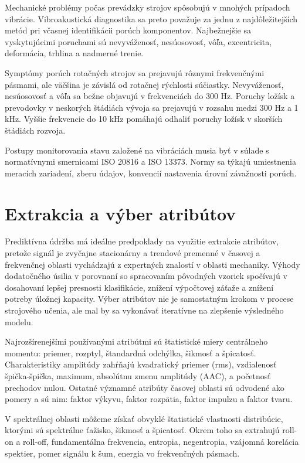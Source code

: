 Mechanické problémy počas prevádzky strojov spôsobujú v mnohých prípadoch vibrácie. Vibroakustická diagnostika sa preto považuje za jednu z najdôležitejších metód pri včasnej identifikácii porúch komponentov. Najbežnejšie sa vyskytujúcimi poruchami sú nevyváženosť, nesúosovosť, vôľa, excentricita, deformácia, trhlina a nadmerné trenie. 

Symptómy porúch rotačných strojov sa prejavujú rôznymi frekvenčnými pásmami, ale väčšina je závislá od rotačnej rýchlosti súčiastky. Nevyváženosť, nesúosovosť a vôľa sa bežne objavujú v frekvenciách do 300 Hz. Poruchy ložísk a prevodovky v neskorých štádiách vývoja sa prejavujú v rozsahu medzi 300 Hz a 1 kHz. Vyššie frekvencie do 10 kHz pomáhajú odhaliť poruchy ložísk v skorších štádiách rozvoja.

Postupy monitorovania stavu založené na vibráciách musia byť v súlade s normatívnymi smernicami ISO 20816 a ISO 13373. Normy sa týkajú umiestnenia meracích zariadení, zberu údajov, konvencií nastavenia úrovní závažnosti porúch. 

\section{Extrakcia a výber atribútov}
Prediktívna údržba má ideálne predpoklady na využitie extrakcie atribútov, pretože signál je zvyčajne stacionárny a trendové premenné v časovej a frekvenčnej oblasti vychádzajú z expertných znalostí v oblasti mechaniky. Výhody dodatočného úsilia v porovnaní so spracovaním pôvodných vzoriek spočívajú v dosahovaní lepšej presnosti klasifikácie, znížení výpočtovej záťaže a znížení potreby úložnej kapacity. Výber atribútov nie je samostatným krokom v procese strojového učenia, ale mal by sa vykonávať iteratívne na zlepšenie výsledného modelu.

Najrozšírenejšími používanými atribútmi sú štatistické miery centrálneho momentu: priemer, rozptyl, štandardná odchýlka, šikmosť a špicatosť. Charakteristiky amplitúdy zahŕňajú kvadratický priemer (rms), vzdialenosť špička-špička, maximum, absolútnu zmenu amplitúdy (AAC), a početnosť prechodov nulou. Ostatné významné atribúty časovej oblasti sú odvodené ako pomery a sú nim: faktor výkyvu, faktor rozpätia, faktor impulzu a faktor tvaru.  

V spektrálnej oblasti môžeme získať obvyklé štatistické vlastnosti distribúcie, ktorými sú spektrálne ťažisko, šikmosť a špicatosť. Okrem toho sa extrahujú roll-on a roll-off, fundamentálna frekvencia, entropia, negentropia, vzájomná korelácia spektier, pomer signálu k šum, energia vo frekvenčných pásmach.

